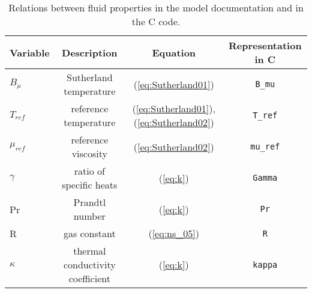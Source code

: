\documentclass[10pt]{article}
\begin{document}
\begin{table}[p]
\caption{Relations between fluid properties in the model documentation and in the C code.}
\centering
\begin{tabular}{l c c c}
\hline\hline
     Variable    &  Description & Equation &Representation in C  \\ [0.25ex]
\hline 
$B_\mu$   	& Sutherland temperature			& (\ref{eq:Sutherland01})  & \texttt{B\_mu}	 \vspace{2pt} \\
$T_{ref}$ 	& reference temperature				& (\ref{eq:Sutherland01}), (\ref{eq:Sutherland02})	& \texttt{T\_ref}		\vspace{2pt} \\
$\mu_{ref}$	& reference viscosity				& (\ref{eq:Sutherland02}) & \texttt{mu\_ref} \vspace{2pt} \\
$\gamma$	& ratio of specific heats			& (\ref{eq:k})			  & \texttt{Gamma}	 \vspace{2pt} \\
Pr			& Prandtl number					& (\ref{eq:k})			  & \texttt{Pr}		 \vspace{2pt} \\
R			& gas constant						& (\ref{eq:ns_05})		  & \texttt{R}		 \vspace{2pt} \\
$\kappa$    & thermal conductivity coefficient  & (\ref{eq:k})            & \texttt{kappa}   \vspace{2pt} \\
\hline
\end{tabular}
\label{table_aux_var}
\end{table}
\end{document}
